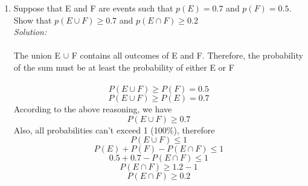 \documentclass[a4paper]{article}
\begin{document}
\begin{enumerate}
\begin{math}
		=P(A \cup B) + P(C) - P((A\cap C) \cup (B\cap C))
		\newline
		=P(A) +P(B) - P(A \cap B) + P(C) - ( P(A \cap C) + P(B \cap C) - P(A \cap B \cap C) )
		\newline
		=P(A) + P(B) + P(C) - P(A \cap B) - P(B \cap C) - P(A \cap C) + P(A \cap B \cap C)
		\end{math}
		\item Suppose that E and F are events such that $p(E) = 0.7$ and $p(F) = 0.5$. Show that $p(E \cup F) \geq 0.7$ and $p(E \cap F) \geq 0.2$\\
		\textit{Solution:}\\\\
		The union E $\cup$ F contains all outcomes of E and F.
		Therefore, the probability of the sum must be at least the probability of either E or F\\\\
		\begin{equation*}
		P(E\cup F) \geq P(F) = 0.5
		\end{equation*}
		\begin{equation*}
		P(E\cup F) \geq P(E) = 0.7
		\end{equation*}
		According to the above reasoning, we have 
		\begin{equation*}
		P(E\cup F) \geq 0.7
		\end{equation*}
		Also, all probabilities can't exceed 1 (100\%), therefore\\
		\begin{equation*}
		P(E\cup F) \leq 1
		\end{equation*}
		\begin{equation*}
		P(E) + P(F) - P(E \cap F) \leq 1
		\end{equation*}
		\begin{equation*}
		0.5 + 0.7 - P(E \cap F) \leq 1
		\end{equation*}
		\begin{equation*}
		P(E \cap F) \geq 1.2 - 1 
		\end{equation*}
		\begin{equation*}
		P(E \cap F) \geq 0.2
		\end{equation*}
		
	\end{enumerate}
	
\end{document}
